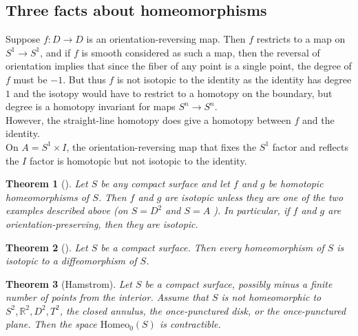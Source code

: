 \documentclass[reqno]{amsart}
\newtheorem{theorem}{Theorem}[section]
\theoremstyle{definition}
\theoremstyle{remark}
\newcommand{\Homeo}{{\mathrm{Homeo}}}
\begin{document}
\subsection{Three facts about homeomorphisms}

Suppose $f \colon D \to D$ is an orientation-reversing map.
Then $f$ restricts to a map on $S^{1} \to S^{1}$, and
if $f$ is smooth considered as such a map, then the
reversal of orientation implies that since the fiber
of any point is a single point, the degree of $f$ 
must be $-1$. But thus $f$ is not isotopic to the identity
as the identity has degree $1$ and the isotopy would
have to restrict to a homotopy on the boundary, but
degree is a homotopy invariant for maps $S^{n} \to S^{n}$.\\
However, the straight-line homotopy does give a homotopy
between $f$ and the identity.\todo{} \\
\linebreak
On $A = S^{1} \times I$, the orientation-reversing map
that fixes the $S^{1}$ factor and reflects the $I$ factor
is homotopic but not isotopic to the identity.


\begin{theorem}[]\cite[Theorem 2.34]{Farb-Margalit}
    \label{thm234}
    Let $S$ be any compact surface and let $f$ and $g$ be
    homotopic homeomorphisms of $S$. Then $f$ and $g$ are
    isotopic unless they are one of the two examples described
    above (on $S = D^2$ and $S = A$ ). In particular,
    if $f$ and $g$ are orientation-preserving, then they
    are isotopic.
\end{theorem}



\begin{theorem}[]\cite[Theorem 2.35]{Farb-Margalit}
    Let $S$ be a compact surface. Then every homeomorphism of
    $S$ is isotopic to a diffeomorphism of $S$.
\end{theorem}

\begin{theorem}[Hamstrom]\cite[Theorem 2.36]{Farb-Margalit}
    Let $S$ be a compact surface, possibly minus a finite
    number of points from the interior. Assume that
    $S$ is not homeomorphic to
    $S^2, \mathbb{R}^2, D^2, T^2$, the closed annulus,
    the once-punctured disk, or the once-punctured plane. Then
    the space $\Homeo_0 (S)$ is contractible.
\end{theorem}




\newpage
\end{document}
